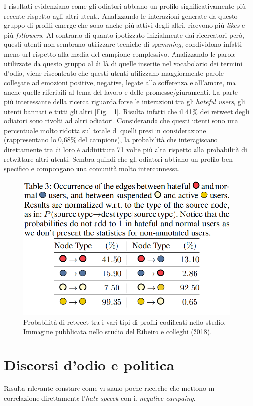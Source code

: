 I risultati evidenziano come gli odiatori abbiano un profilo significativamente più recente rispetto agli altri utenti. Analizzando le interazioni generate da questo gruppo di profili emerge che sono anche più attivi degli altri, ricevono più \textit{likes} e più \textit{followers}. Al contrario di quanto ipotizzato inizialmente dai ricercatori però, questi utenti non sembrano utilizzare tecniche di \textit{spamming}, condividono infatti meno url rispetto alla media del campione complessivo. Analizzando le parole utilizzate da questo gruppo al di là di quelle inserite nel vocabolario dei termini d'odio, viene riscontrato che questi utenti utilizzano maggiormente parole collegate ad emozioni positive, negative, legate alla sofferenza e all'amore, ma anche quelle riferibili al tema del lavoro e delle promesse/giuramenti.
La parte più interessante della ricerca riguarda forse le interazioni tra gli \textit{hateful users}, gli utenti bannati e tutti gli altri [Fig. ~\ref{hatenet}]. Risulta infatti che il 41\% dei retweet degli odiatori sono rivolti ad altri odiatori. Considerando che questi utenti sono una percentuale molto ridotta sul totale di quelli presi in considerazione (rappresentano lo 0,68\% del campione), la probabilità che interagiscano direttamente tra di loro è addirittura 71 volte più alta rispetto alla probabilità di retwittare altri utenti. Sembra quindi che gli odiatori abbiano un profilo ben specifico e compongano una comunità molto interconnessa.
\begin{figure}
	\centering
	\includegraphics[width=0.8\linewidth]{figures/hatenet}
	\caption{Probabilità di retweet tra i vari tipi di profili codificati nello studio. Immagine pubblicata nello studio del Ribeiro e colleghi (2018).}
	\label{hatenet}
\end{figure}


\section{Discorsi d'odio e politica}
Risulta rilevante constare come vi siano poche ricerche che mettono in correlazione direttamente l'\textit{hate speech} con il \textit{negative campaing}.

